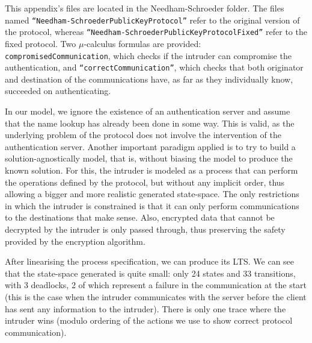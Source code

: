 \documentclass[11pt]{article}
\theoremstyle{definition}
\theoremstyle{plain}
\begin{document}
\begin{appendices}
This appendix's files are located in the Needham-Schroeder folder. The files named \texttt{``Needham-SchroederPublicKeyProtocol''} refer to the original version of the protocol, whereas \texttt{``Needham-SchroederPublicKeyProtocolFixed''} refer to the fixed protocol. Two $ \mu $-calculus formulas are provided: \texttt{compromisedCommunication}, which checks if the intruder can compromise the authentication, and \texttt{``correctCommunication''}, which checks that both originator and destination of the communications have, as far as they individually know, succeeded on authenticating.

In our model, we ignore the existence of an authentication server and assume that the name lookup has already been done in some way. This is valid, as the underlying problem of the protocol does not involve the intervention of the authentication server. Another important paradigm applied is to try to build a solution-agnostically model, that is, without biasing the model to produce the known solution. For this, the intruder is modeled as a process that can perform the operations defined by the protocol, but without any implicit order, thus allowing a bigger and more realistic generated state-space. The only restrictions in which the intruder is constrained is that it can only perform communications to the destinations that make sense. Also, encrypted data that cannot be decrypted by the intruder is only passed through, thus preserving the safety provided by the encryption algorithm.

After linearising the process specification, we can produce its LTS. We can see that the state-space generated is quite small: only 24 states and 33 transitions, with 3 deadlocks, 2 of which represent a failure in the communication at the start (this is the case when the intruder communicates with the server before the client has sent any information to the intruder). There is only one trace where the intruder wins (modulo ordering of the actions we use to show correct protocol communication).


\end{appendices}
\end{document}
